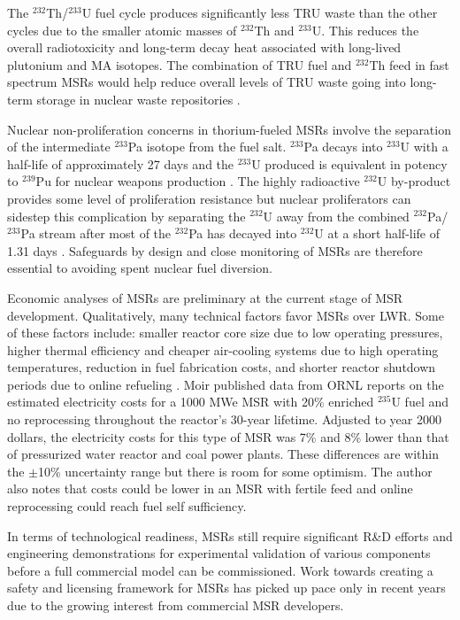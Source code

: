The $^{232}$Th/$^{233}$U fuel cycle produces significantly less \gls{TRU}
waste than the other cycles due to the smaller atomic masses of $^{232}$Th and
$^{233}$U. This reduces the overall radiotoxicity and long-term decay heat
associated with long-lived plutonium and \gls{MA} isotopes. The combination
of \gls{TRU} fuel and $^{232}$Th feed in fast spectrum \glspl{MSR} would help
reduce overall levels of \gls{TRU} waste going into long-term storage in
nuclear waste repositories \cite{merle-lucotte_launching_2011}.

Nuclear non-proliferation concerns in thorium-fueled \glspl{MSR} involve the
separation of the intermediate $^{233}$Pa
isotope from the fuel salt. $^{233}$Pa decays into $^{233}$U with a half-life
of approximately 27 days and the $^{233}$U produced is equivalent in potency
to $^{239}$Pu for nuclear weapons production \cite{grape_10_2017}. The highly
radioactive $^{232}$U
by-product provides some level of proliferation resistance but nuclear
proliferators can sidestep this complication by
separating the $^{232}$U away from the combined $^{232}$Pa/$^{233}$Pa stream
after most of the $^{232}$Pa has decayed into $^{232}$U at a short half-life
of 1.31 days \cite{grape_10_2017}. Safeguards by design and close monitoring
of \glspl{MSR} are therefore essential to avoiding spent nuclear fuel
diversion.

Economic analyses of \glspl{MSR} are preliminary at the current
stage of \gls{MSR} development. Qualitatively, many technical factors favor
\glspl{MSR} over \gls{LWR}. Some of these factors include: smaller reactor
core size due to low operating pressures, higher thermal efficiency and
cheaper air-cooling systems due to high operating temperatures, reduction in
fuel fabrication costs, and shorter reactor shutdown periods due to online
refueling \cite{dolan_1_2017}. Moir \cite{moir_recommendations_2008}
published data from \gls{ORNL} reports on the estimated electricity costs for
a 1000 MWe \gls{MSR} with 20\% enriched $^{235}$U fuel and no reprocessing
throughout the reactor's 30-year lifetime. Adjusted to year 2000 dollars, the
electricity costs for this type of \gls{MSR} was 7\% and 8\% lower than that
of pressurized water reactor and coal power plants. These differences are
within the $\pm$10\% uncertainty range but there is room for some optimism.
The author also notes that costs could be lower in an \gls{MSR} with
fertile feed and online reprocessing could reach fuel self sufficiency.

In terms of technological readiness, \glspl{MSR} still require significant
R\&D efforts and engineering demonstrations for experimental validation of
various components before a full commercial model can be commissioned. Work
towards creating a safety and licensing framework for \glspl{MSR} has picked
up pace only in recent years due to the growing interest from commercial
\gls{MSR} developers.

